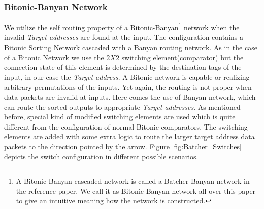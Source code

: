 				  \subsubsection{Bitonic-Banyan Network}
					      We utilize the self routing property of a Bitonic-Banyan\footnote{A Bitonic-Banyan cascaded network is called a Batcher-Banyan network in the reference paper\cite{batcher_banyan_ref}.
					      We call it as Bitonic-Banyan  network all over this paper to give an intuitive meaning how the network is constructed.} network \cite{batcher_banyan_ref} when the invalid 
					      \textit{Target-addresses} are found at the input. The configuration contains
					      a Bitonic Sorting Network cascaded with a Banyan routing network. As in the case of a Bitonic Network we use the $2 X 2$ switching element(comparator) but the connection state of this
					      element is determined by the destination tags of the input, in our case the \textit{Target address}. A Bitonic network is capable or realizing arbitrary permutations of the inputs. 
					      Yet again, the routing is not proper when data packets are invalid at inputs. Here comes the use of Banyan network, which can route the sorted outputs to appropriate
					      \textit{Target addresses}. As mentioned before, special kind of modified switching elements are used which is quite different from the configuration of normal Bitonic comparators.
					      The switching elements are added with some extra logic to route the larger target address data packets to the direction pointed by the arrow. 
					      Figure \ref{fig:Batcher_Switches} depicts the switch configuration in different possible scenarios. 
					      
